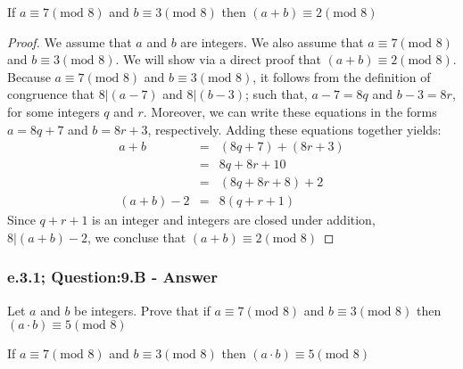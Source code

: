 \begin{tcolorbox}
	\begin{theorem}
		If $a \equiv 7 (\text{mod 8})$ and $b \equiv 3 (\text{mod 8})$ then $(a + b) \equiv 2 (\text{mod 8})$

	\end{theorem}
\end{tcolorbox}

\begin{proof}
We assume that $a$ and $b$ are integers. We also assume that $a \equiv 7 (\text{mod 8})$ and $b \equiv 3 (\text{mod 8})$. We will show via a direct proof that $(a+b) \equiv 2 (\text{mod 8})$. Because $a \equiv 7 (\text{mod 8})$ and $b \equiv 3 (\text{mod 8})$, it follows from the definition of congruence that $8|(a-7)$ and $8|(b-3)$; such that, $a-7 = 8q$ and $b-3 = 8r$, for some integers $q$ and $r$. Moreover, we can write these equations in the forms $a = 8q + 7$ and $b = 8r + 3$, respectively. 
Adding these equations together yields: 
	\begin{eqnarray}
		a + b & = & (8q + 7) + (8r + 3) \nonumber \\
		& = & 8q + 8r + 10 \nonumber \\
		& = & (8q + 8r + 8) + 2 \nonumber \\
		(a + b) - 2 & = & 8(q + r + 1) \nonumber
	\end{eqnarray}
Since $q + r + 1$ is an integer and integers are closed under addition, $8 | (a + b) - 2$, we concluse that 
$(a+b) \equiv 2 (\text{mod 8})$

\end{proof}



\subsubsection*{e.3.1; Question:9.B - Answer}
Let $a$ and $b$ be integers. Prove that if $a \equiv 7 (\text{mod 8})$ and $b \equiv 3 (\text{mod 8})$ then $(a \cdot b) \equiv 5 (\text{mod 8})$

\begin{tcolorbox}
	\begin{theorem}
		If $a \equiv 7 (\text{mod 8})$ and $b \equiv 3 (\text{mod 8})$ then $(a \cdot b) \equiv 5 (\text{mod 8})$
	\end{theorem}
\end{tcolorbox}

